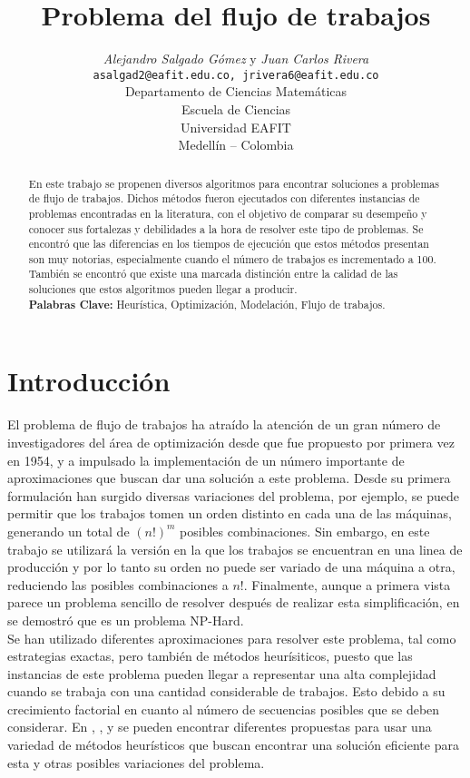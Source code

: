 \documentclass[10pt, twoside]{article}
\title{Problema del flujo de trabajos}
\author{\emph{Alejandro Salgado Gómez} y \emph{Juan Carlos Rivera}\\
\vspace{0.3cm}
\small{\tt{asalgad2@eafit.edu.co, jrivera6@eafit.edu.co}}\\
Departamento de Ciencias Matemáticas\\
Escuela de Ciencias\\
Universidad EAFIT\\
Medellín -- Colombia}
\date{}
\begin{document}
    \maketitle

    \thispagestyle{firststyle}

\begin{abstract}
En este trabajo se propenen diversos algoritmos para encontrar
soluciones a problemas de flujo de trabajos. Dichos métodos fueron ejecutados
con diferentes instancias de problemas encontradas en la literatura, con el
objetivo de comparar su desempeño y conocer sus fortalezas y debilidades a
la hora de resolver este tipo de problemas. Se encontró que las diferencias en
los tiempos de ejecución que estos métodos presentan son muy notorias,
especialmente cuando el número de trabajos es incrementado a 100. También
se encontró que existe una marcada distinción entre la calidad de las
soluciones que estos algoritmos pueden llegar a producir.\\

\noindent \textbf{Palabras Clave:}
Heurística, Optimización, Modelación, Flujo de trabajos.
\end{abstract}

\section{Introducción}

El problema de flujo de trabajos ha atraído la atención de un gran número de
investigadores del área de optimización desde que fue propuesto por primera vez
en 1954, y a impulsado la implementación de un número importante de
aproximaciones que buscan dar una solución a este problema. Desde su primera
formulación han surgido diversas variaciones del problema, por ejemplo, se puede
permitir que los trabajos tomen un orden distinto en cada una de las máquinas,
generando un total de $(n!)^m$ posibles combinaciones. Sin embargo, en este
trabajo se utilizará la versión en la que los trabajos se encuentran en una linea
de producción y por lo tanto su orden no puede ser variado de una máquina a otra,
reduciendo las posibles combinaciones a $n!$. Finalmente, aunque a primera
vista parece un problema sencillo de resolver después de realizar esta
simplificación, en \cite{complex} se demostró que es un problema
NP-Hard.\\

Se han utilizado diferentes aproximaciones para resolver este problema, tal como
estrategias exactas, pero también de métodos heurísiticos, puesto que las
instancias de este problema pueden llegar a representar una alta complejidad
cuando se trabaja con una cantidad considerable de trabajos. Esto debido a su
crecimiento factorial en cuanto al número de secuencias posibles que se deben
considerar. En \cite{heuristico4}, \cite{heuristico1}, \cite{heuristico2} y
\cite{heuristico3} se pueden encontrar diferentes propuestas para usar una
variedad de métodos heurísticos que buscan encontrar una solución eficiente
para esta y otras posibles variaciones del problema.\\
\end{document}
